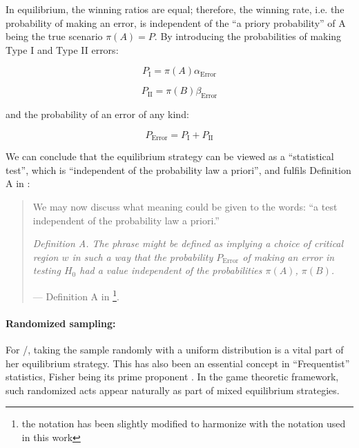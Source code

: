 \documentclass{article}
\theoremstyle{definition}
\begin{document}
In equilibrium, the winning ratios are equal; therefore, the winning rate, i.e. the probability of making an error, is independent of the ``a priory probability'' of A being the true scenario $\pi(A)=P$. By introducing the probabilities of making Type I and Type II errors:

\begin{equation}
    P_\mathrm{I} = \pi(A) \alpha_\mathrm{Error}
\end{equation}

\begin{equation}
    P_\mathrm{II} = \pi(B) \beta_\mathrm{Error}
\end{equation}

and the probability of an error of any kind:

\begin{equation}
    P_\mathrm{Error} = P_\mathrm{I} + P_\mathrm{II}
\end{equation}

We can conclude that the equilibrium strategy can be viewed as a ``statistical test'', which is ``independent of the probability law a priori'', and fulfils Definition A in \cite{paper:NeymanPearson1933b}: 

    \begin{quote}
    We may now discuss what meaning could be given to the words:
    ``a test independent of the probability law a priori.''

    {\it
    Definition A. The phrase might be defined as implying a choice
    of critical region $w$ in such a way that the probability $P_\mathrm{Error}$ of
    making an error in testing $H_0$ had a value independent of the
    probabilities $\pi(A)$, $\pi(B)$.
    }

    \hfill --- Definition A in \cite{paper:NeymanPearson1933b} \footnote{the notation has been slightly modified to harmonize with the notation used in this work}.
    \end{quote}

\paragraph{Randomized sampling:}

For \PI/, taking the sample randomly with a uniform distribution is a vital part of her equilibrium strategy.
This has also been an essential concept in ``Frequentist'' statistics, Fisher being its prime proponent \cite{book:FisherDesignOfExperiments,paper:FishersDevil}.
In the game theoretic framework, such randomized acts appear naturally as part of mixed equilibrium strategies. 
\end{document}
